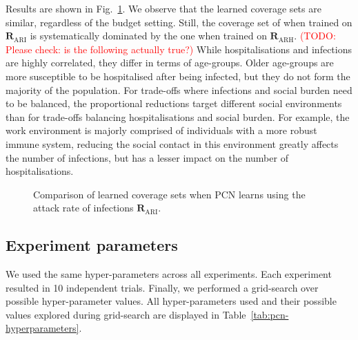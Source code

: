 \documentclass{article}
\newcommand\todo[1]{\textcolor{red}{(TODO: #1)}}
\begin{document}
Results are shown in Fig.~\ref{fig:pf-binomial-arh-ari}. We observe that the learned coverage sets are similar, regardless of the budget setting. Still, the coverage set of when trained on $\mathbf{R}_{\text{ARI}}$ is systematically dominated by the one when trained on $\mathbf{R}_{\text{ARH}}$. \todo{Please check: is the following actually true?} While hospitalisations and infections are highly correlated, they differ in terms of age-groups. Older age-groups are more susceptible to be hospitalised after being infected, but they do not form the majority of the population. For trade-offs where infections and social burden need to be balanced, the proportional reductions target different social environments than for trade-offs balancing hospitalisations and social burden. For example, the work environment is majorly comprised of individuals with a more robust immune system, reducing the social contact in this environment greatly affects the number of infections, but has a lesser impact on the number of hospitalisations.

\begin{figure}[t!]
    \centering
    
    \caption{Comparison of learned coverage sets when PCN learns using the attack rate of infections $\mathbf{R}_{\text{ARI}}$.}
    \label{fig:pf-binomial-arh-ari}
\end{figure}

\subsection{Experiment parameters}
\label{sec:pcn-hyperparameters}

We used the same hyper-parameters across all experiments. Each experiment resulted in 10 independent trials. Finally, we performed a grid-search over possible hyper-parameter values. All hyper-parameters used and their possible values explored during grid-search are displayed in Table~\ref{tab:pcn-hyperparameters}.
\end{document}
